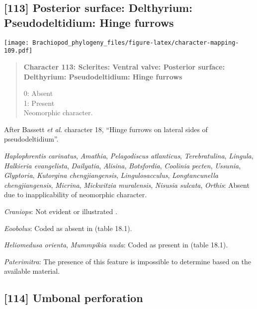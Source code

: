 \documentclass[openany]{book}
\theoremstyle{definition}
\theoremstyle{definition}
\theoremstyle{definition}
\theoremstyle{remark}
\begin{document}
\subsection*{{[}113{]} Posterior surface: Delthyrium: Pseudodeltidium:
Hinge
furrows}\label{posterior-surface-delthyrium-pseudodeltidium-hinge-furrows}

\texttt{[image: Brachiopod\_phylogeny\_files/figure-latex/character-mapping-109.pdf]}

\begin{quote}
\textbf{Character 113: Sclerites: Ventral valve: Posterior surface:
Delthyrium: Pseudodeltidium: Hinge furrows}

0: Absent\\
1: Present\\
Neomorphic character.
\end{quote}

After Bassett \emph{et al}.
\citeyearpar{Bassett2001Functionalmorphology} character 18, ``Hinge
furrows on lateral sides of pseudodeltidium''.

\hypertarget{Alisina-coding-113}{}
\emph{Haplophrentis carinatus}, \emph{Amathia}, \emph{Pelagodiscus
atlanticus}, \emph{Terebratulina}, \emph{Lingula}, \emph{Halkieria
evangelista}, \emph{Dailyatia}, \emph{Alisina}, \emph{Botsfordia},
\emph{Coolinia pecten}, \emph{Ussunia}, \emph{Glyptoria},
\emph{Kutorgina chengjiangensis}, \emph{Lingulosacculus},
\emph{Longtancunella chengjiangensis}, \emph{Micrina}, \emph{Mickwitzia
muralensis}, \emph{Nisusia sulcata}, \emph{Orthis}: Absent due to
inapplicability of neomorphic character.

\hypertarget{Craniops-coding-113}{}
\emph{Craniops}: Not evident or illustrated
\citep{Hanken1985Thetaxonomy}.

\hypertarget{Eoobolus-coding-113}{}
\emph{Eoobolus}: Coded as absent in
\citet{Bassett2001Functionalmorphology} (table 18.1).

\hypertarget{Heliomedusa_orienta-coding-113}{}
\emph{Heliomedusa orienta}, \emph{Mummpikia nuda}: Coded as present in
\citet{Bassett2001Functionalmorphology} (table 18.1).

\hypertarget{Paterimitra-coding-113}{}
\emph{Paterimitra}: The presence of this feature is impossible to
determine based on the available material.

\subsection*{{[}114{]} Umbonal perforation}\label{umbonal-perforation}
\end{document}
